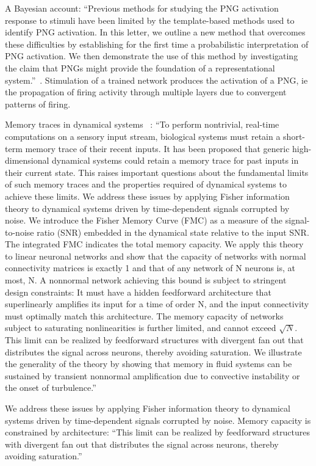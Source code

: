 \documentclass[brainsci, %
               review,submit,pdftex,moreauthors]{Definitions/mdpi}
\begin{document}
A Bayesian account: ``Previous methods for studying the PNG activation response to stimuli have been limited by the template-based methods used to identify PNG activation. In this letter, we outline a new method that overcomes these difficulties by establishing for the first time a probabilistic interpretation of PNG activation. We then demonstrate the use of this method by investigating the claim that PNGs might provide the foundation of a representational system.''~\citep{guise_bayesian_2014}. Stimulation of a trained network produces the activation of a PNG, ie the propagation of firing activity through multiple layers due to convergent patterns of firing.

Memory traces in dynamical systems~\citep{ganguli_memory_2008} : ``To perform nontrivial, real-time computations on a sensory input stream, biological systems must retain a short-term memory trace of their recent inputs. It has been proposed that generic high-dimensional dynamical systems could retain a memory trace for past inputs in their current state. This raises important questions about the fundamental limits of such memory traces and the properties required of dynamical systems to achieve these limits. We address these issues by applying Fisher information theory to dynamical systems driven by time-dependent signals corrupted by noise. We introduce the Fisher Memory Curve (FMC) as a measure of the signal-to-noise ratio (SNR) embedded in the dynamical state relative to the input SNR. The integrated FMC indicates the total memory capacity. We apply this theory to linear neuronal networks and show that the capacity of networks with normal connectivity matrices is exactly 1 and that of any network of N neurons is, at most, N. A nonnormal network achieving this bound is subject to stringent design constraints: It must have a hidden feedforward architecture that superlinearly amplifies its input for a time of order N, and the input connectivity must optimally match this architecture. The memory capacity of networks subject to saturating nonlinearities is further limited, and cannot exceed $\sqrt N$. This limit can be realized by feedforward structures with divergent fan out that distributes the signal across neurons, thereby avoiding saturation. We illustrate the generality of the theory by showing that memory in fluid systems can be sustained by transient nonnormal amplification due to convective instability or the onset of turbulence.''

We address these issues by applying Fisher information theory to dynamical systems driven by time-dependent signals corrupted by noise. Memory capacity is constrained by architecture: ``This limit can be realized by feedforward structures with divergent fan out that distributes the signal across neurons, thereby avoiding saturation.''
\end{document}
